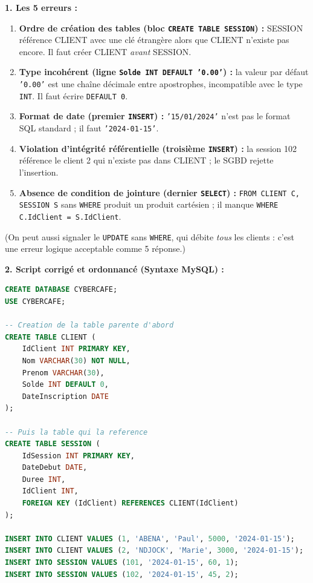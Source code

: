 \documentclass[11pt]{article}
\begin{document}
\begin{corrige}
\textbf{1. Les 5 erreurs :}
\begin{enumerate}
    \item \textbf{Ordre de création des tables (bloc \texttt{CREATE TABLE SESSION}) :} SESSION référence CLIENT avec une clé étrangère alors que CLIENT n'existe pas encore. Il faut créer CLIENT \emph{avant} SESSION.
    \item \textbf{Type incohérent (ligne \texttt{Solde INT DEFAULT '0.00'}) :} la valeur par défaut \texttt{'0.00'} est une chaîne décimale entre apostrophes, incompatible avec le type \texttt{INT}. Il faut écrire \texttt{DEFAULT 0}.
    \item \textbf{Format de date (premier \texttt{INSERT}) :} \texttt{'15/01/2024'} n'est pas le format SQL standard ; il faut \texttt{'2024-01-15'}.
    \item \textbf{Violation d'intégrité référentielle (troisième \texttt{INSERT}) :} la session 102 référence le client 2 qui n'existe pas dans CLIENT ; le SGBD rejette l'insertion.
    \item \textbf{Absence de condition de jointure (dernier \texttt{SELECT}) :} \texttt{FROM CLIENT C, SESSION S} sans \texttt{WHERE} produit un produit cartésien ; il manque \texttt{WHERE C.IdClient = S.IdClient}.
\end{enumerate}
(On peut aussi signaler le \texttt{UPDATE} sans \texttt{WHERE}, qui débite \emph{tous} les clients : c'est une erreur logique acceptable comme 5\ieme{} réponse.)

\textbf{2. Script corrigé et ordonnancé (Syntaxe MySQL) :}
\begin{lstlisting}[language=SQL]
CREATE DATABASE CYBERCAFE;
USE CYBERCAFE;

-- Creation de la table parente d'abord
CREATE TABLE CLIENT (
    IdClient INT PRIMARY KEY,
    Nom VARCHAR(30) NOT NULL,
    Prenom VARCHAR(30),
    Solde INT DEFAULT 0,
    DateInscription DATE
);

-- Puis la table qui la reference
CREATE TABLE SESSION (
    IdSession INT PRIMARY KEY,
    DateDebut DATE,
    Duree INT,
    IdClient INT,
    FOREIGN KEY (IdClient) REFERENCES CLIENT(IdClient)
);

INSERT INTO CLIENT VALUES (1, 'ABENA', 'Paul', 5000, '2024-01-15');
INSERT INTO CLIENT VALUES (2, 'NDJOCK', 'Marie', 3000, '2024-01-15');
INSERT INTO SESSION VALUES (101, '2024-01-15', 60, 1);
INSERT INTO SESSION VALUES (102, '2024-01-15', 45, 2);


\end{lstlisting}
\end{corrige}
\end{document}
